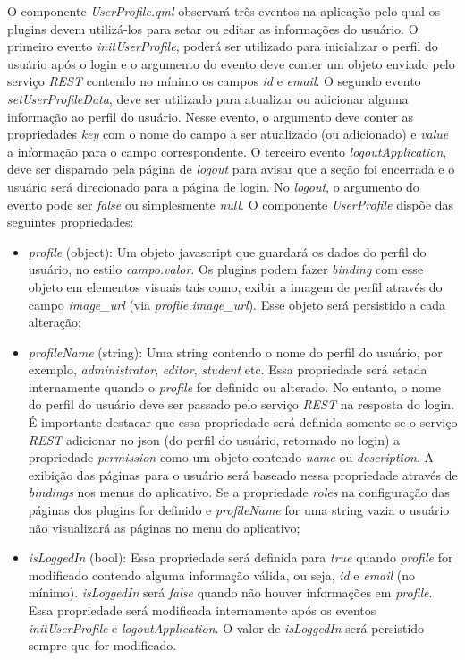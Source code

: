 O componente \textit{UserProfile.qml} observará três eventos na aplicação pelo qual os plugins devem utilizá-los para setar ou editar as informações do usuário. O primeiro evento \textit{initUserProfile}, poderá ser utilizado para inicializar o perfil do usuário após o login e o argumento do evento deve conter um objeto enviado pelo serviço \textit{REST} contendo no mínimo os campos \textit{id} e \textit{email}. O segundo evento \textit{setUserProfileData}, deve ser utilizado para atualizar ou adicionar alguma informação ao perfil do usuário. Nesse evento, o argumento deve conter as propriedades \textit{key} com o nome do campo a ser atualizado (ou adicionado) e \textit{value} a informação para o campo correspondente. O terceiro evento \textit{logoutApplication}, deve ser disparado pela página de \textit{logout} para avisar que a seção foi encerrada e o usuário será direcionado para a página de login. No \textit{logout}, o argumento do evento pode ser \textit{false} ou simplesmente \textit{null}. O componente \textit{UserProfile} dispõe das seguintes propriedades:

\begin{itemize}
	\item \textit{profile} (object): Um objeto javascript que guardará os dados do perfil do usuário, no estilo \textit{campo.valor}. Os plugins podem fazer \textit{binding} com esse objeto em elementos visuais tais como, exibir a imagem de perfil através do campo \textit{image\_url} (via \textit{profile.image\_url}). Esse objeto será persistido a cada alteração;

	\item \textit{profileName} (string): Uma string contendo o nome do perfil do usuário, por exemplo, \textit{administrator}, \textit{editor}, \textit{student} etc. Essa propriedade será setada internamente quando o \textit{profile} for definido ou alterado. No entanto, o nome do perfil do usuário deve ser passado pelo serviço \textit{REST} na resposta do login. É importante destacar que essa propriedade será definida somente se o serviço \textit{REST} adicionar no json (do perfil do usuário, retornado no login) a propriedade \textit{permission} como um objeto contendo \textit{name} ou \textit{description}. A exibição das páginas para o usuário será baseado nessa propriedade através de \textit{bindings} nos menus do aplicativo. Se a propriedade \textit{roles} na configuração das páginas dos plugins for definido e \textit{profileName} for uma string vazia o usuário não visualizará as páginas no menu do aplicativo;

	\item \textit{isLoggedIn} (bool): Essa propriedade será definida para \textit{true} quando \textit{profile} for modificado contendo alguma informação válida, ou seja, \textit{id} e \textit{email} (no mínimo). \textit{isLoggedIn} será \textit{false} quando não houver informações em \textit{profile}. Essa propriedade será modificada internamente após os eventos \textit{initUserProfile} e \textit{logoutApplication}. O valor de \textit{isLoggedIn} será persistido sempre que for modificado.
\end{itemize}

